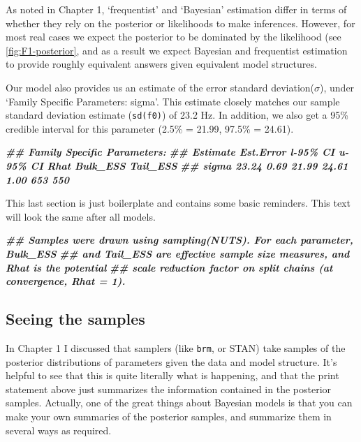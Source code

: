 \documentclass[
]{book}
\newenvironment{Shaded}{\begin{snugshade}}{\end{snugshade}}
\newcommand{\DocumentationTok}[1]{\textcolor[rgb]{0.56,0.35,0.01}{\textbf{\textit{#1}}}}
\begin{document}
As noted in Chapter 1, `frequentist' and `Bayesian' estimation differ in terms of whether they rely on the posterior or likelihoods to make inferences. However, for most real cases we expect the posterior to be dominated by the likelihood (see \ref{fig:F1-posterior}, and as a result we expect Bayesian and frequentist estimation to provide roughly equivalent answers given equivalent model structures.

Our model also provides us an estimate of the error standard deviation(\(\sigma\)), under `Family Specific Parameters: sigma'. This estimate closely matches our sample standard deviation estimate (\texttt{sd(f0)}) of 23.2 Hz. In addition, we also get a 95\% credible interval for this parameter (2.5\% = 21.99, 97.5\% = 24.61).

\begin{Shaded}
\begin{Highlighting}[]
\DocumentationTok{\#\# Family Specific Parameters: }
\DocumentationTok{\#\#       Estimate Est.Error l{-}95\% CI u{-}95\% CI Rhat Bulk\_ESS Tail\_ESS}
\DocumentationTok{\#\# sigma    23.24      0.69    21.99    24.61 1.00      653      550}
\end{Highlighting}
\end{Shaded}

This last section is just boilerplate and contains some basic reminders. This text will look the same after all models.

\begin{Shaded}
\begin{Highlighting}[]
\DocumentationTok{\#\# Samples were drawn using sampling(NUTS). For each parameter, Bulk\_ESS}
\DocumentationTok{\#\# and Tail\_ESS are effective sample size measures, and Rhat is the potential}
\DocumentationTok{\#\# scale reduction factor on split chains (at convergence, Rhat = 1).}
\end{Highlighting}
\end{Shaded}

\hypertarget{seeing-the-samples}{%
\subsection{Seeing the samples}\label{seeing-the-samples}}

In Chapter 1 I discussed that samplers (like \texttt{brm}, or STAN) take samples of the posterior distributions of parameters given the data and model structure. It's helpful to see that this is quite literally what is happening, and that the print statement above just summarizes the information contained in the posterior samples. Actually, one of the great things about Bayesian models is that you can make your own summaries of the posterior samples, and summarize them in several ways as required.
\end{document}
